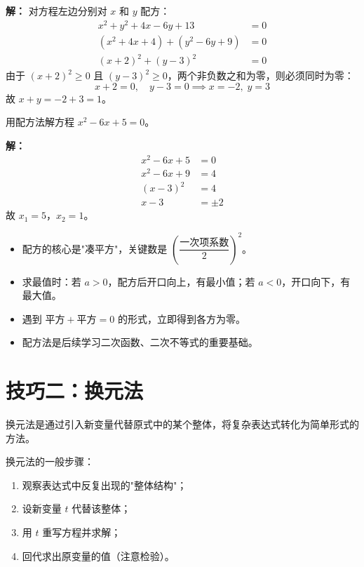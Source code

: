 \documentclass[12pt, a4paper]{ctexart}
\begin{document}
\textbf{解：} 对方程左边分别对 $x$ 和 $y$ 配方：
\begin{align*}
x^2 + y^2 + 4x - 6y + 13 &= 0 \\
(x^2 + 4x + 4) + (y^2 - 6y + 9) &= 0 \\
(x+2)^2 + (y-3)^2 &= 0
\end{align*}
由于 $(x+2)^2 \geqslant 0$ 且 $(y-3)^2 \geqslant 0$，两个非负数之和为零，则必须同时为零：
\[
x+2 = 0,\quad y-3 = 0 \implies x = -2,\; y = 3
\]
故 $x+y = -2+3 = \boxed{1}$。

\begin{examplebox}[【例3】配方解一元二次方程]
用配方法解方程 $x^2 - 6x + 5 = 0$。
\end{examplebox}

\textbf{解：}
\begin{align*}
x^2 - 6x + 5 &= 0 \\
x^2 - 6x + 9 &= 4 \\
(x-3)^2 &= 4 \\
x - 3 &= \pm 2
\end{align*}
故 $x_1 = 5$，$x_2 = 1$。

\begin{tipbox}[配方法要点总结]
\begin{itemize}[leftmargin=1.5em]
  \item 配方的核心是"凑平方"，关键数是 $\left(\dfrac{\text{一次项系数}}{2}\right)^2$。
  \item 求最值时：若 $a>0$，配方后开口向上，有最小值；若 $a<0$，开口向下，有最大值。
  \item 遇到 $\text{平方}+\text{平方}=0$ 的形式，立即得到各方为零。
  \item 配方法是后续学习二次函数、二次不等式的重要基础。
\end{itemize}
\end{tipbox}

\section*{\textcolor{mainblue}{技巧二：换元法}}

\begin{knowledgebox}[换元法的核心思想]
换元法是通过引入新变量代替原式中的某个整体，将复杂表达式转化为简单形式的方法。

换元法的一般步骤：
\begin{enumerate}[leftmargin=2em]
  \item 观察表达式中反复出现的"整体结构"；
  \item 设新变量 $t$ 代替该整体；
  \item 用 $t$ 重写方程并求解；
  \item 回代求出原变量的值（注意检验）。
\end{enumerate}
\end{knowledgebox}
\end{document}
